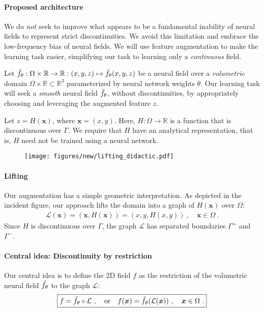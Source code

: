 \paragraph{Proposed architecture}
We do \emph{not} seek to improve what appears to be a fundamental inability of neural fields to represent strict discontinuities. We avoid this limitation and embrace the low-frequency bias of neural fields. We will use feature augmentation to make the learning task easier, simplifying our task to learning only a \emph{continuous} field.

Let $\Tilde{f}_{\theta} : \Omega \times \mathbb{R} \rightarrow \mathbb{R} : (x,y,z) \mapsto \Tilde{f}_{\theta}(x,y,z)$ be a neural field over a \emph{volumetric} domain $\Omega \times \mathbb{R} \subset \mathbb{R}^3$ parameterized
by neural network weights $\theta$. Our learning task will seek a \emph{smooth} neural field $\Tilde{f}_{\theta}$, without discontinuities, by appropriately choosing and leveraging the augmented feature $z$.

Let $z=H(\bm{x})$, where $\bm{x}=(x,y)$. Here, $H: \Omega \rightarrow \mathbb{R}$ is a function that is discontinuous over $\Gamma$. We require that $H$ have an analytical representation, that is, $H$ need not be trained using a neural network. 

\begin{wrapfigure}[4]{r}[-10pt]{0.25\linewidth}
\vspace{-5ex}
\texttt{[image: figures/new/lifting\_didactic.pdf]}
\end{wrapfigure}
\paragraph{Lifting}
Our augmentation has a simple geometric interpretation. As depicted in the incident figure, our approach lifts the domain into a graph of $H(\bm{x})$ over $\Omega$:
\begin{align}
    \mathcal{L}(\bm{x}) = (\bm{x},H(\bm{x})) = (x,y,H(x,y)) \ , \quad \bm{x} \in \Omega \ .
\end{align}
Since $H$ is discontinuous over $\Gamma$, the graph $\mathcal{L}$ has separated boundaries $\Gamma^+$ and $\Gamma^-$.

\paragraph{Central idea: Discontinuity by restriction}
Our central idea is to define the 2D field $f$ as the restriction of the volumetric neural field $\Tilde{f}_{\theta}$ to the graph $\mathcal{L}$:
\begin{align}
\label{eq:restriction}
\boxed{
    f = \Tilde{f}_{\theta}\circ \mathcal{L} \ , \quad \textrm{or} \quad
    f(\bm{x}) = \Tilde{f}_{\theta}(\mathcal{L}(\bm{x})) \ ,\quad \bm{x} \in \Omega \ .
    }
\end{align}

